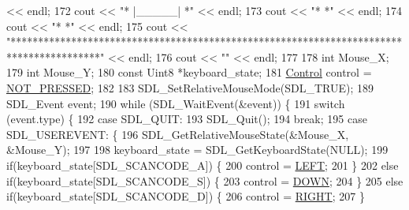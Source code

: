 \begin{DoxyCode}
      << endl;
172         cout << \textcolor{stringliteral}{"*                                        |\_\_\_\_\_|                                       *"} 
      << endl;
173         cout << \textcolor{stringliteral}{"*                                                                                      *"} 
      << endl;
174         cout << \textcolor{stringliteral}{"*                                                                                      *"} 
      << endl;
175         cout << \textcolor{stringliteral}{"****************************************************************************************"} 
      << endl;
176         cout << \textcolor{stringliteral}{""} << endl;
177 
178         \textcolor{keywordtype}{int} Mouse\_X;
179         \textcolor{keywordtype}{int} Mouse\_Y;
180         \textcolor{keyword}{const} Uint8 *keyboard\_state;
181     \hyperlink{common_8h_a0da83e35f29c11f7f3c637234f2149f9}{Control} control = \hyperlink{common_8h_a0da83e35f29c11f7f3c637234f2149f9acdb8b9a398ffbd729218a27d00d8fa45}{NOT\_PRESSED};
182 
183         SDL\_SetRelativeMouseMode(SDL\_TRUE);
189         SDL\_Event event;
190         \textcolor{keywordflow}{while} (SDL\_WaitEvent(&event)) \{
191                 \textcolor{keywordflow}{switch} (event.type) \{
192                         \textcolor{keywordflow}{case} SDL\_QUIT:
193                                 SDL\_Quit();
194                                 \textcolor{keywordflow}{break};
195                         \textcolor{keywordflow}{case} SDL\_USEREVENT: \{
196                                 SDL\_GetRelativeMouseState(&Mouse\_X, &Mouse\_Y);
197 
198                                 keyboard\_state = SDL\_GetKeyboardState(NULL);
199                                 \textcolor{keywordflow}{if}(keyboard\_state[SDL\_SCANCODE\_A]) \{
200                                     control = \hyperlink{common_8h_a0da83e35f29c11f7f3c637234f2149f9adb45120aafd37a973140edee24708065}{LEFT};
201                             \}
202                                 \textcolor{keywordflow}{else} \textcolor{keywordflow}{if}(keyboard\_state[SDL\_SCANCODE\_S]) \{
203                                 control = \hyperlink{common_8h_a0da83e35f29c11f7f3c637234f2149f9a9b0b4a95b99523966e0e34ffdadac9da}{DOWN};
204                                 \}
205                                 \textcolor{keywordflow}{else} \textcolor{keywordflow}{if}(keyboard\_state[SDL\_SCANCODE\_D]) \{
206                                     control = \hyperlink{common_8h_a0da83e35f29c11f7f3c637234f2149f9aec8379af7490bb9eaaf579cf17876f38}{RIGHT};
207                                 \}

\end{DoxyCode}
